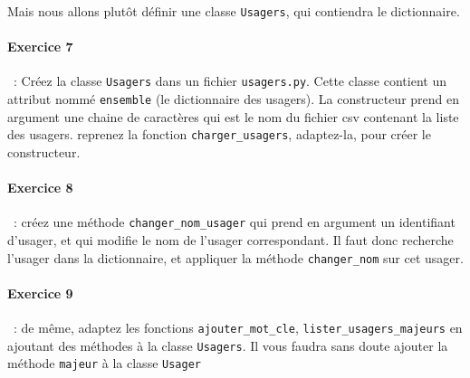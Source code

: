 \documentclass{article}
\begin{document}
Mais nous allons plutôt définir une classe \texttt{Usagers}, qui contiendra le dictionnaire.

\paragraph{Exercice 7}~: Créez la classe \texttt{Usagers} dans un fichier \texttt{usagers.py}. Cette classe contient un attribut nommé \texttt{ensemble} (le dictionnaire des usagers). La constructeur prend en argument une chaine de caractères qui est le nom du fichier csv contenant la liste des usagers. reprenez la fonction \texttt{charger\_usagers}, adaptez-la, pour créer le constructeur.

\paragraph{Exercice 8}~: créez une méthode \texttt{changer\_nom\_usager} qui prend en argument un identifiant d'usager, et qui modifie le nom de l'usager correspondant. Il faut donc recherche l'usager dans la dictionnaire, et appliquer la méthode \texttt{changer\_nom} sur cet usager. 

\paragraph{Exercice 9}~:  de même, adaptez les fonctions \texttt{ajouter\_mot\_cle}, \texttt{lister\_usagers\_majeurs} en ajoutant des méthodes à la classe \texttt{Usagers}. Il vous faudra sans doute ajouter la méthode \texttt{majeur} à la classe \texttt{Usager}


  
\end{document}
